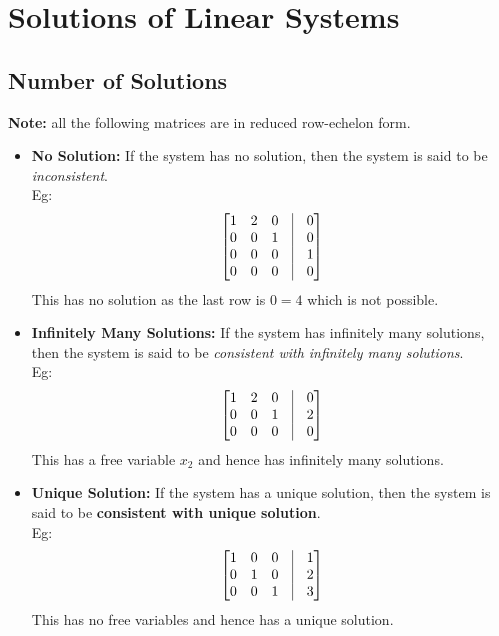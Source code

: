 \documentclass{article}
\begin{document}
\section{Solutions of Linear Systems}
\subsection{Number of Solutions}
\textbf{Note:} all the following matrices are in reduced row-echelon form.
\begin{itemize}
    \item \textbf{No Solution:} If the system has no solution, then the system is said to be \emph{inconsistent}.\\
    Eg: \[\begin{bmatrix}
        1 & 2 & 0 & \vline & 0 \\
        0 & 0 & 1 & \vline & 0 \\
        0 & 0 & 0 & \vline & 1 \\
        0 & 0 & 0 & \vline & 0 
        \end{bmatrix}\]
        This has no solution as the last row is $0 = 4$ which is not possible.
    \item \textbf{Infinitely Many Solutions:} If the system has infinitely many solutions, then the system is said to be \emph{consistent with infinitely many solutions}.\\
    Eg: \[\begin{bmatrix}
        1 & 2 & 0 & \vline & 0 \\
        0 & 0 & 1 & \vline & 2 \\
        0 & 0 & 0 & \vline & 0 
        \end{bmatrix}\]
        This has a free variable $x_2$ and hence has infinitely many solutions.

        \item \textbf{Unique Solution:} If the system has a unique solution, then the system is said to be \textbf{consistent with unique solution}.\\
    Eg: \[\begin{bmatrix}
        1 & 0 & 0 & \vline & 1 \\
        0 & 1 & 0 & \vline & 2 \\
        0 & 0 & 1 & \vline & 3 
        \end{bmatrix}\]
        This has no free variables and hence has a unique solution.
\end{itemize}
\end{document}
